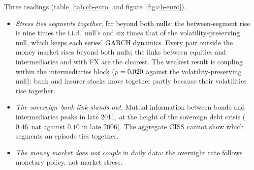 \documentclass[11pt]{article}
\theoremstyle{definition}
\begin{document}
Three readings (table~\ref{tab:cb-euro} and figure~\ref{fig:cb-euro}).
\begin{itemize}
\item \emph{Stress ties segments together}, far beyond both nulls: the
between-segment rise is nine times the i.i.d.\ null's and six times that of
the volatility-preserving null, which keeps each series' GARCH dynamics. Every
pair outside the money market rises beyond both nulls; the links between
equities and intermediaries and with FX are the clearest. The weakest result
is coupling within the intermediaries block ($p=0.020$ against the
volatility-preserving null): bank and insurer stocks move together partly
because their volatilities rise together.
\item \emph{The sovereign--bank link stands out.} Mutual information between
bonds and intermediaries peaks in late 2011, at the height of the sovereign
debt crisis ($0.46$~nat against $0.10$ in late 2006). The aggregate CISS
cannot show which segments an episode ties together.
\item \emph{The money market does not couple} in daily data: the overnight
rate follows monetary policy, not market stress.
\end{itemize}

\begin{table}[htbp]
\centering
\small
{}
\caption{Euro area against official indicators. The AUROC is the probability
that a randomly drawn recession date has a higher indicator than a
non-recession date ($0.5$: no power; $1$: perfect separation).
Growth-at-Risk: regression of the bottom decile of four-quarter GDP growth on
the indicator \citep{adrian2019}, 79~quarters.}
\label{tab:cb-official}
\end{table}
\end{document}
